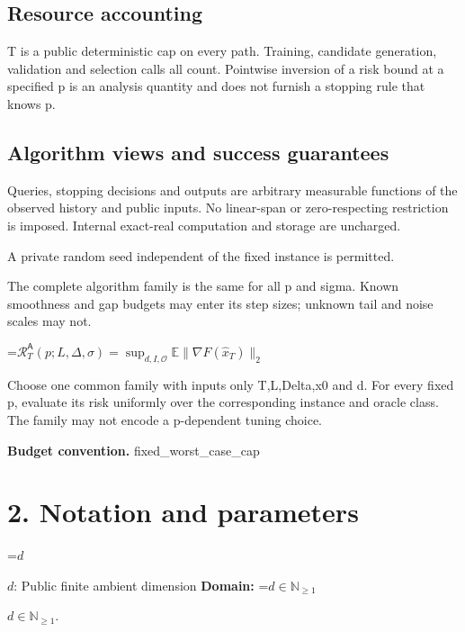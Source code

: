 \documentclass[10pt,a4paper]{article}
\newcommand{\AtlasMath}[1]{\par\begingroup\centering\setbox0=\hbox{$\displaystyle #1$}\ifdim\wd0>1.4\linewidth\typeout{ATLAS WIDE FORMULA: \the\wd0}\fi\ifdim\wd0>\linewidth\resizebox{\linewidth}{!}{\box0}\else\box0\fi\par\endgroup}
\newcommand{\AtlasInlineMath}[1]{\begingroup\setbox0=\hbox{$#1$}\ifdim\wd0>.4\linewidth\endgroup\AtlasMath{#1}\else\endgroup$#1$\fi}
\begin{document}
\subsection{Resource accounting}


T is a public deterministic cap on every path. Training, candidate generation, validation and selection calls all count. Pointwise inversion of a risk bound at a specified p is an analysis quantity and does not furnish a stopping rule that knows p.



\subsection{Algorithm views and success guarantees}


Queries, stopping decisions and outputs are arbitrary measurable functions of the observed history and public inputs. No linear-span or zero-respecting restriction is imposed. Internal exact-real computation and storage are uncharged.



A private random seed independent of the fixed instance is permitted.



The complete algorithm family is the same for all p and sigma. Known smoothness and gap budgets may enter its step sizes; unknown tail and noise scales may not.




\AtlasMath{\mathcal R_T^{\mathsf A}(p;L,\Delta,\sigma)=\sup_{d,I,\mathcal O}\mathbb E\|\nabla F(\widehat x_T)\|_2}




Choose one common family with inputs only T,L,Delta,x0 and d. For every fixed p, evaluate its risk uniformly over the corresponding instance and oracle class. The family may not encode a p-dependent tuning choice.



\textbf{Budget convention.} fixed\_worst\_case\_cap



\section{2. Notation and parameters}


\AtlasInlineMath{d}: Public finite ambient dimension \textbf{Domain:} \AtlasInlineMath{d\in\mathbb N_{\ge1}}.
\end{document}

